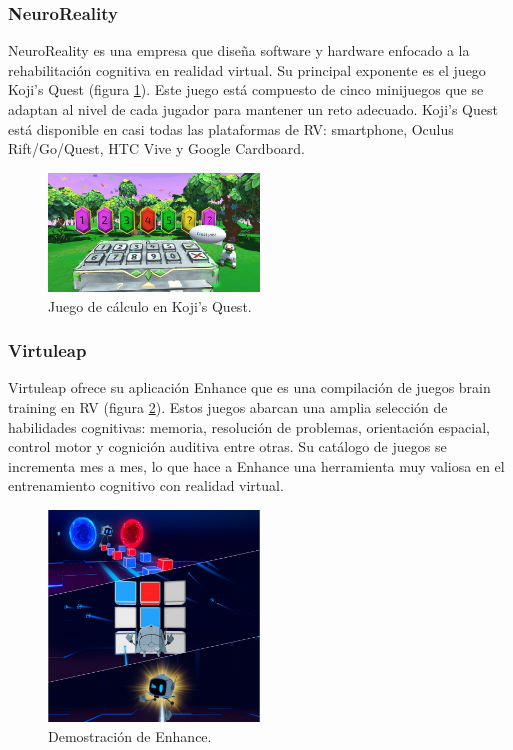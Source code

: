 \subsubsection{NeuroReality}

NeuroReality es una empresa que diseña software y hardware enfocado a la rehabilitación cognitiva en realidad virtual. Su principal exponente es el juego Koji’s Quest (figura \ref{fig:EA_kojisQuest}). Este juego está compuesto de cinco minijuegos que se adaptan al nivel de cada jugador para mantener un reto adecuado. Koji’s Quest está disponible en casi todas las plataformas de RV: smartphone, Oculus Rift/Go/Quest, HTC Vive y Google Cardboard.


\begin{figure}
  \centering
\includegraphics[width=0.5\textwidth]{03.EstudioProblema/01.EstadoArte/00.Figuras/07.kojis_quest.png}
    \caption{Juego de cálculo en Koji's Quest. \cite{EA_img_kojisQuest}}
    \label{fig:EA_kojisQuest}
\end{figure}

\subsubsection{Virtuleap}

Virtuleap ofrece su aplicación Enhance que es una compilación de juegos brain training en RV (figura \ref{fig:EA_enhance}). Estos juegos abarcan una amplia selección de habilidades cognitivas: memoria, resolución de problemas, orientación espacial, control motor y cognición auditiva entre otras. Su catálogo de juegos se incrementa mes a mes, lo que hace a Enhance una herramienta muy valiosa en el entrenamiento cognitivo con realidad virtual.


\begin{figure}
  \centering
\includegraphics[width=0.5\textwidth]{03.EstudioProblema/01.EstadoArte/00.Figuras/08.enhance.jpg}
    \caption{Demostración de Enhance. \cite{EA_img_enhance}}
    \label{fig:EA_enhance}
\end{figure}

